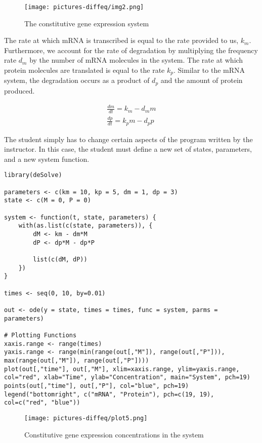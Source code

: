 \begin{figure}[H]
    \centering
    \texttt{[image: pictures-diffeq/img2.png]}
    \caption{The constitutive gene expression system}
\end{figure}

The rate at which mRNA is transcribed is equal to the rate provided to us, $k_{m}$. Furthermore, we account for the rate of degradation by multiplying the frequency rate $d_{m}$ by the number of mRNA molecules in the system. The rate at which protein molecules are translated is equal to the rate $k_{p}$. Similar to the mRNA system, the degradation occurs as a product of $d_{p}$ and the amount of protein produced. 

\begin{gather*}
    \frac{dm}{dt}=k_{m}-d_{m}m\\
    \frac{dp}{dt}=k_{p}m-d_{p}p
\end{gather*}

The student simply has to change certain aspects of the program written by the instructor. In this case, the student must define a new set of states, parameters, and a new system function.

\begin{lstlisting}
library(deSolve)

parameters <- c(km = 10, kp = 5, dm = 1, dp = 3)
state <- c(M = 0, P = 0)

system <- function(t, state, parameters) {
    with(as.list(c(state, parameters)), {
        dM <- km - dm*M
        dP <- dp*M - dp*P
        
        list(c(dM, dP))
    })
}

times <- seq(0, 10, by=0.01)

out <- ode(y = state, times = times, func = system, parms = parameters)

# Plotting Functions
xaxis.range <- range(times)
yaxis.range <- range(min(range(out[,"M"]), range(out[,"P"])), max(range(out[,"M"]), range(out[,"P"])))
plot(out[,"time"], out[,"M"], xlim=xaxis.range, ylim=yaxis.range, col="red", xlab="Time", ylab="Concentration", main="System", pch=19)
points(out[,"time"], out[,"P"], col="blue", pch=19)
legend("bottomright", c("mRNA", "Protein"), pch=c(19, 19), col=c("red", "blue"))
\end{lstlisting}

\begin{figure}[H]
    \centering
    \texttt{[image: pictures-diffeq/plot5.png]}
    \caption{Constitutive gene expression concentrations in the system}
\end{figure}

